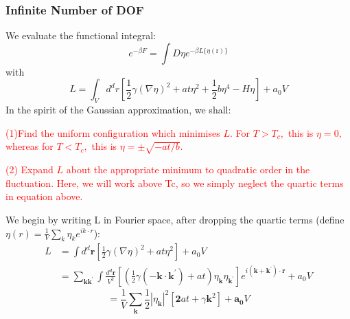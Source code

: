 \documentclass[12pt,titlepage]{article}
\newcommand{\redp}[1]{\textcolor{red}{#1}}
\numberwithin{equation}{section}
\begin{document}
\subsubsection{Infinite Number of DOF}
We evaluate the functional integral:
\begin{equation}
e^{-\beta F}=\int D \eta e^{-\beta L\{\eta(\mathrm{r})\}}
\end{equation}
with
\begin{equation}
L=\int_{V} d^{d} r\left[\frac{1}{2} \gamma(\nabla \eta)^{2}+a t \eta^{2}+\frac{1}{2} b \eta^{4}-H \eta\right]+a_{0} V
\end{equation}
In the spirit of the Gaussian approximation, we shall:

\redp{(1)Find the uniform configuration which minimises $L .$ For $T>T_{c},$ this is $\eta=0,$ whereas for $T<T_{c},$ this is $\eta=\pm \sqrt{-a t / b} .$}

\redp{(2) Expand $L$ about the appropriate minimum to quadratic order in the fluctuation. Here, we will work above Tc, so we simply neglect the quartic terms in equation above.}

We begin by writing L in Fourier space, after dropping the quartic terms (define $\eta(r)=\frac{1}{V}\sum_k\eta_k e^{ik\cdot r}$):
\begin{equation}
\begin{aligned} L &=\int d^{d} \mathbf{r}\left[\frac{1}{2} \gamma(\nabla \eta)^{2}+a t \eta^{2}\right]+a_{0} V \\ &=\sum_{\mathbf{k} \mathbf{k}^{\prime}} \int \frac{d^{d} \mathbf{r}}{V^{2}}\left[\left(\frac{1}{2} \gamma\left(-\mathbf{k} \cdot \mathbf{k}^{\prime}\right)+a t\right) \eta_{\mathbf{k}} \eta_{\mathbf{k}^{\prime}}\right] e^{i\left(\mathbf{k}+\mathbf{k}^{\prime}\right) \cdot \mathbf{r}}+a_{0} V \end{aligned}
\end{equation}
\begin{equation}
=\frac{1}{V} \sum_{\mathbf{k}} \frac{1}{2}\left|\eta_{\mathbf{k}}\right|^{2}\left[\mathbf{2} a t+\gamma \boldsymbol{k}^{2}\right]+\boldsymbol{a}_{\mathbf{0}} V
\end{equation}
\end{document}
